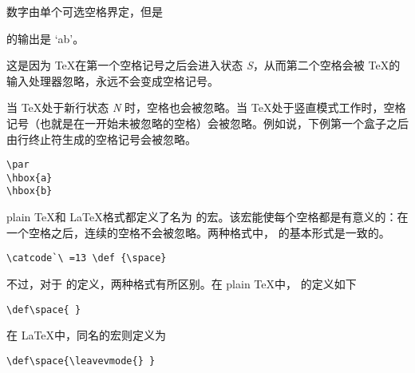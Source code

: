 \documentclass{book}
\begin{document}
数字由单个可选空格界定，但是
\begin{disp}\quad 的输出是 \quad `ab'。\end{disp}这是因为 \TeX 在第一个空格记号之后会进入状态 {\itshape S}，从而第二个空格会被 \TeX 的输入处理器忽略，永远不会变成空格记号。

当 \TeX 处于新行状态 {\itshape N} 时，空格也会被忽略。当 \TeX 处于竖直模式工作时，空格记号（也就是在一开始未被忽略的空格）会被忽略。例如说，下例第一个盒子之后由行终止符生成的空格记号会被忽略。
\begin{verbatim}
\par
\hbox{a}
\hbox{b}
\end{verbatim}

plain \TeX 和 \LaTeX 格式都定义了名为  的宏。该宏能使每个空格都是有意义的：在一个空格之后，连续的空格不会被忽略。两种格式中， 的基本形式是一致的。
\begin{verbatim}
\catcode`\ =13 \def {\space}
\end{verbatim}
不过，对于  的定义，两种格式有所区别。在 plain \TeX 中， 的定义如下
\begin{verbatim}
\def\space{ }
\end{verbatim}
在 \LaTeX 中，同名的宏则定义为
\begin{verbatim}
\def\space{\leavevmode{} }
\end{verbatim}
\end{document}
